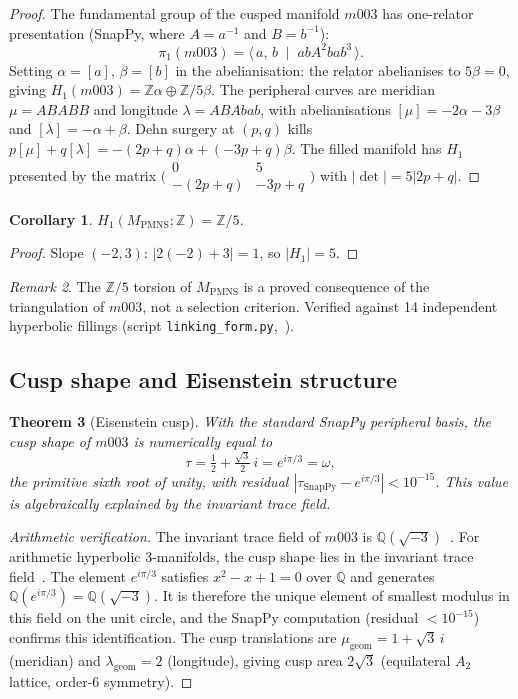 \documentclass[11pt,a4paper]{article}
\newtheorem{theorem}{Theorem}
\newtheorem{corollary}[theorem]{Corollary}
\theoremstyle{definition}
\theoremstyle{remark}
\newtheorem{remark}[theorem]{Remark}
\newcommand{\ZZ}{\mathbb{Z}}
\newcommand{\QQ}{\mathbb{Q}}
\newcommand{\MPMNS}{M_{\mathrm{PMNS}}}
\begin{document}
\begin{proof}
The fundamental group of the cusped manifold $m003$ has
one-relator presentation
(SnapPy, where $A = a^{-1}$ and $B = b^{-1}$):
\[
  \pi_1(m003)
  = \langle\, a,\,b \;\mid\; abA^2bab^3 \,\rangle.
\]
Setting $\alpha=[a]$, $\beta=[b]$ in the abelianisation:
the relator abelianises to $5\beta=0$, giving
$H_1(m003) = \ZZ\alpha \oplus \ZZ/5\beta$.
The peripheral curves are meridian $\mu = ABABB$ and
longitude $\lambda = ABAbab$, with abelianisations
$[\mu] = -2\alpha-3\beta$ and $[\lambda] = -\alpha+\beta$.
Dehn surgery at $(p,q)$ kills
$p[\mu]+q[\lambda] = -(2p+q)\alpha+(-3p+q)\beta$.
The filled manifold has $H_1$ presented by the matrix
$\bigl(\begin{smallmatrix}0&5\\-(2p+q)&-3p+q\end{smallmatrix}\bigr)$
with $|\det| = 5|2p+q|$.
\end{proof}

\begin{corollary}
\label{cor:h1}
$H_1(\MPMNS;\ZZ) = \ZZ/5$.
\end{corollary}
\begin{proof}
Slope $(-2,3)$: $|2(-2)+3| = 1$, so $|H_1| = 5$.
\end{proof}

\begin{remark}
The $\ZZ/5$ torsion of $\MPMNS$ is a proved consequence of
the triangulation of $m003$, not a selection criterion.
Verified against 14 independent hyperbolic fillings
(script \texttt{linking\_form.py},~\cite{GitHub}).
\end{remark}

\subsection{Cusp shape and Eisenstein structure}

\begin{theorem}[Eisenstein cusp]
\label{thm:cusp}
With the standard SnapPy peripheral basis,
the cusp shape of $m003$ is numerically equal to
\[
  \tau = \tfrac{1}{2}+\tfrac{\sqrt{3}}{2}\,i
       = e^{i\pi/3} = \omega,
\]
the primitive sixth root of unity, with residual
$|\tau_{\mathrm{SnapPy}} - e^{i\pi/3}| < 10^{-15}$.
This value is algebraically explained by the invariant trace field.
\end{theorem}

\begin{proof}[Arithmetic verification]
The invariant trace field of $m003$ is $\QQ(\sqrt{-3})$~\cite{Chinburg98}.
For arithmetic hyperbolic 3-manifolds, the cusp shape lies in the
invariant trace field~\cite{MaclachlanReid}.
The element $e^{i\pi/3}$ satisfies $x^2-x+1=0$ over $\QQ$
and generates $\QQ(e^{i\pi/3}) = \QQ(\sqrt{-3})$.
It is therefore the unique element of smallest modulus in this
field on the unit circle, and the SnapPy computation
(residual $< 10^{-15}$) confirms this identification.
The cusp translations are $\mu_{\mathrm{geom}} = 1+\sqrt{3}\,i$
(meridian) and $\lambda_{\mathrm{geom}} = 2$ (longitude),
giving cusp area $2\sqrt{3}$ (equilateral $A_2$ lattice,
order-6 symmetry).
\end{proof}
\end{document}
